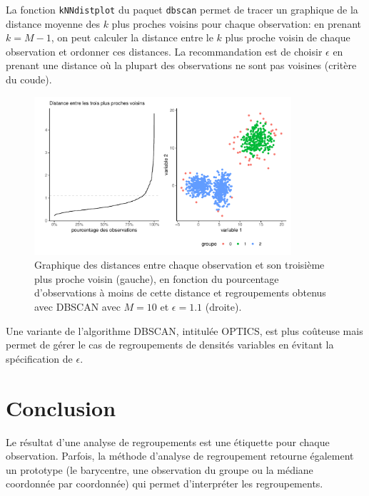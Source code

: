 \documentclass[
  11pt,
  letterpaper,
]{scrbook}
\theoremstyle{definition}
\theoremstyle{remark}
\begin{document}
La fonction \texttt{kNNdistplot} du paquet \texttt{dbscan} permet de
tracer un graphique de la distance moyenne des \(k\) plus proches
voisins pour chaque observation: en prenant \(k=M-1\), on peut calculer
la distance entre le \(k\) plus proche voisin de chaque observation et
ordonner ces distances. La recommandation est de choisir \(\epsilon\) en
prenant une distance où la plupart des observations ne sont pas voisines
(critère du coude).

\begin{figure}[ht!]

{\centering \includegraphics[width=0.85\textwidth,height=\textheight]{regroupements_files/figure-pdf/fig-dbscan2-1.pdf}

}

\caption{\label{fig-dbscan2}Graphique des distances entre chaque
observation et son troisième plus proche voisin (gauche), en fonction du
pourcentage d'observations à moins de cette distance et regroupements
obtenus avec DBSCAN avec \(M=10\) et \(\epsilon=1.1\) (droite).}

\end{figure}

Une variante de l'algorithme DBSCAN, intitulée OPTICS, est plus coûteuse
mais permet de gérer le cas de regroupements de densités variables en
évitant la spécification de \(\epsilon\).

\hypertarget{conclusion}{%
\section{Conclusion}\label{conclusion}}

Le résultat d'une analyse de regroupements est une étiquette pour chaque
observation. Parfois, la méthode d'analyse de regroupement retourne
également un prototype (le barycentre, une observation du groupe ou la
médiane coordonnée par coordonnée) qui permet d'interpréter les
regroupements.
\end{document}
